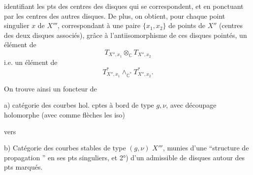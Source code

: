identifiant les pts des centres des disques
qui se correspondent, et en ponctuant
par les centres des autres disques.
De plus, on obtient,  pour chaque
point singulier $x$ de $X'''$, correspondant
à une paire $\{x_1,x_2\}$ de points de
$X''$ (centres des deux disques associés),
grâce à l'antiisomorphisme de ces
disques pointés, un élément 
de
\[
T_{X'',x_1}\otimes_{\mathbb C}T_{X'',x_2}
\]
i.e. un élément de
\[
T^*_{X'',x_1}\wedge_{\mathbb C^*}T^*_{X'',x_2}.
\]

On trouve ainsi un foncteur de

a) catégorie  des courbes hol. cptes à bord  de
type $g,\nu$, avec découpage holomorphe
(avec comme flèches les iso)

vers

b) Catégorie des courbes  stables de type $(g,\nu)$
$X'''$, munies  d'une ``structure de propagation
'' en ses pts singuliers, et 2°) d'un
 admissible de
disques autour des pts marqués.
